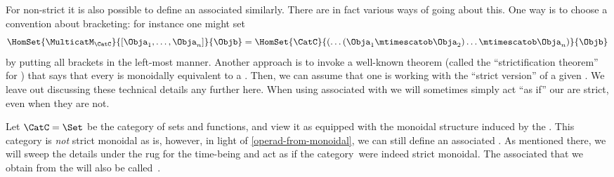 
\begin{remark}
    \label{multicat-from-monoidal}
    For non-strict  it is also possible to define an associated  similarly.
    There are in fact various ways of going about this.
    One way is to choose a convention about bracketing: for instance one might set
    \begin{equation}
        \HomSet{\MulticatM_\CatC}{[\Obja_1,\ldots,\Obja_n]}{\Objb}=\HomSet{\CatC}{ ( \dots (\Obja_1 \mtimescatob \Obja_2) \ldots \mtimescatob \Obja_n)}{\Objb}
    \end{equation}
    by putting all brackets in the left-most manner.
    Another approach is to invoke a well-known theorem (called the ``strictification theorem'' for ) that says that every  is monoidally equivalent to a .
    Then, we can assume that one is working with the ``strict version'' of a given .
    We leave out discussing these technical details any further here.
    When using  associated with  we will sometimes simply act ``as if'' our  are strict, even when they are not.
\end{remark}

\begin{example}
    Let $\CatC = \Set$ be the category of sets and functions, and view it as equipped with the monoidal structure induced by the .
    This category is \emph{not} strict monoidal as is, however, in light of \cref{operad-from-monoidal}, we can still define an associated .
    As mentioned there, we will sweep the details under the rug for the time-being and act as if the category~\Set were indeed strict monoidal.
    The associated  that we obtain from the  \Set will also be called~\Set.
\end{example}

